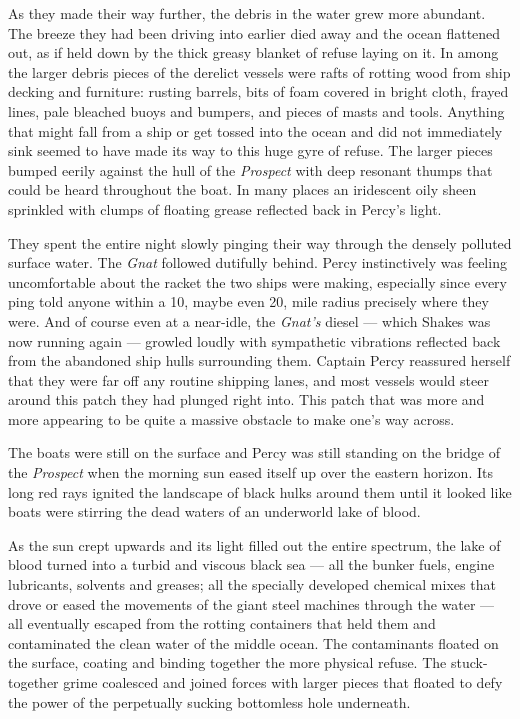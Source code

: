 \documentclass[]{scrbook}
\begin{document}
As they made their way further, the debris in the water grew more
abundant. The breeze they had been driving into earlier died away and
the ocean flattened out, as if held down by the thick greasy blanket of
refuse laying on it. In among the larger debris pieces of the derelict
vessels were rafts of rotting wood from ship decking and furniture:
rusting barrels, bits of foam covered in bright cloth, frayed lines,
pale bleached buoys and bumpers, and pieces of masts and tools. Anything
that might fall from a ship or get tossed into the ocean and did not
immediately sink seemed to have made its way to this huge gyre of
refuse. The larger pieces bumped eerily against the hull of the
\emph{Prospect} with deep resonant thumps that could be heard throughout
the boat. In many places an iridescent oily sheen sprinkled with clumps
of floating grease reflected back in Percy's light.

They spent the entire night slowly pinging their way through the densely
polluted surface water. The \emph{Gnat} followed dutifully behind. Percy
instinctively was feeling uncomfortable about the racket the two ships
were making, especially since every ping told anyone within a 10, maybe
even 20, mile radius precisely where they were. And of course even at a
near-idle, the \emph{Gnat's} diesel --- which Shakes was now running
again --- growled loudly with sympathetic vibrations reflected back from
the abandoned ship hulls surrounding them. Captain Percy reassured
herself that they were far off any routine shipping lanes, and most
vessels would steer around this patch they had plunged right into. This
patch that was more and more appearing to be quite a massive obstacle to
make one's way across.

The boats were still on the surface and Percy was still standing on the
bridge of the \emph{Prospect} when the morning sun eased itself up over
the eastern horizon. Its long red rays ignited the landscape of black
hulks around them until it looked like boats were stirring the dead
waters of an underworld lake of blood.

As the sun crept upwards and its light filled out the entire spectrum,
the lake of blood turned into a turbid and viscous black sea --- all the
bunker fuels, engine lubricants, solvents and greases; all the specially
developed chemical mixes that drove or eased the movements of the giant
steel machines through the water --- all eventually escaped from the
rotting containers that held them and contaminated the clean water of
the middle ocean. The contaminants floated on the surface, coating and
binding together the more physical refuse. The stuck-together grime
coalesced and joined forces with larger pieces that floated to defy the
power of the perpetually sucking bottomless hole underneath.
\end{document}
